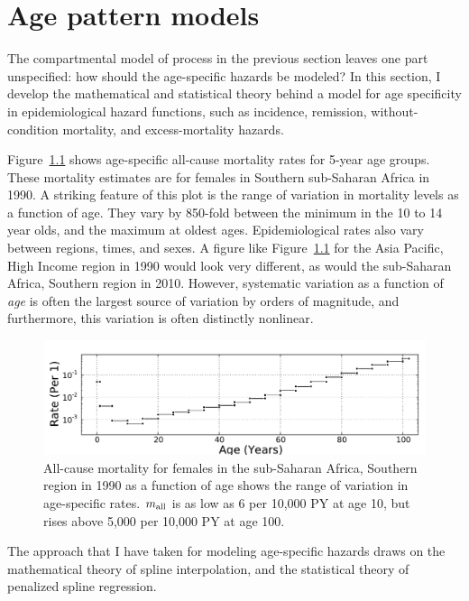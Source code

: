 \chapter{Age pattern models}
\label{theory-age_pattern_model}
The compartmental model of process in the previous section leaves one
part unspecified: how should the age-specific hazards be modeled?  In
this section, I develop the mathematical and statistical theory behind
a model for age specificity in epidemiological hazard functions, such as
incidence, remission, without-condition mortality, and
excess-mortality hazards.

Figure~\ref{ssas-mx_female_1990} shows age-specific all-cause
mortality rates for 5-year age groups.  These mortality estimates are
for females in Southern sub-Saharan Africa in 1990.  A striking
feature of this plot is the range of variation in mortality levels as
a function of age.  They vary by 850-fold between the minimum
in the 10 to 14 year olds, and the maximum at oldest
ages. Epidemiological rates also vary between regions, times, and
sexes.  A figure like Figure~\ref{ssas-mx_female_1990} for the Asia
Pacific, High Income region in 1990 would look very different, as
would the sub-Saharan Africa, Southern region in 2010. However,
systematic variation as a function of \emph{age} is often the largest
source of variation by orders of magnitude, and furthermore, this
variation is often distinctly nonlinear.

\begin{figure}[h]
\begin{center}
\includegraphics[width=\textwidth]{ssas-mx_female_1990.pdf}
\caption{All-cause mortality for females in the sub-Saharan Africa,
  Southern region in 1990 as a function of age shows the range of
  variation in age-specific rates.  $m_{\text{all}}$ is as low as 6 per
  10,000 PY at age 10, but rises above 5,000 per 10,000 PY at age 100.}
\label{ssas-mx_female_1990}
\end{center}
\end{figure}

The approach that I have taken for modeling age-specific hazards draws
on the mathematical theory of spline interpolation, and the
statistical theory of penalized spline regression.


